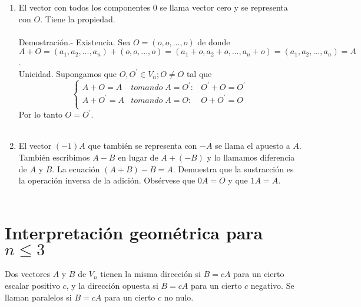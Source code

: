 \begin{teo}
\begin{enumerate}[\bfseries a.]
    \item El vector con todos los componentes $0$ se llama vector cero y se representa con $O$. Tiene la propiedad.\\\\
	Demostración.-\; Existencia. Sea $O = (o,o,...,o)$ de donde $A+O = (a_1,a_2,...,a_n)+(o,o,...,o) = (a_1+o,a_2+o,...,a_n+o) = (a_1,a_2,...,a_n) = A$.\\
	Unicidad. Supongamos que $O,O^{'} \in V_n; O\neq O$ tal que 
	$$\left\{ \begin{array}{ccc} A+O=A&tomando \; A=O^{'}:&O^{'}+O = O^{'}\\ A+O^{'} = A&tomando \; A=O:&O+O^{'}=O\\ \end{array} \right.$$
	Por lo tanto $O=O^{'}$.\\\\
    \item El vector $(-1)A$ que también se representa con $-A$ se llama el apuesto a $A$. También escribimos $A-B$ en lugar de $A+(-B)$ y lo llamamos diferencia de $A$ y $B$. La ecuación $(A+B)-B=A$. Demuestra que la sustracción es la operación inversa de la adición. Obsérvese que $0A=O$ y que $1A=A$.\\\\

\end{enumerate}
    
\end{teo}

\section{Interpretación geométrica para $n\leq 3$}

\begin{tcolorbox}[colframe = white]

    \begin{def.} Dos vectores $A$ y $B$ de $V_n$ tienen la misma dirección si $B=cA$ para un cierto escalar positivo $c$, y la dirección opuesta si $B=cA$ para un cierto $c$ negativo. Se llaman paralelos si $B=cA$ para un cierto $c$ no nulo.
    \end{def.}
\end{tcolorbox}

